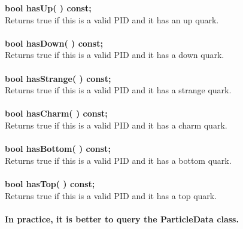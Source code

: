 \documentclass[twoside,12pt]{article}
\begin{document}
\begin{tabbing}
\hspace{0.5in}  {\bf bool hasUp( )      const; }\\
\hspace{0.5in}  Returns true if this is a valid PID and it has an up quark. \\ \\
\hspace{0.5in}  {\bf bool hasDown( )    const; }\\
\hspace{0.5in}  Returns true if this is a valid PID and it has a down quark.\\ \\
\hspace{0.5in}  {\bf bool hasStrange( ) const; }\\
\hspace{0.5in}  Returns true if this is a valid PID and it has a strange quark.\\ \\
\hspace{0.5in}  {\bf bool hasCharm( )   const; }\\
\hspace{0.5in}  Returns true if this is a valid PID and it has a charm quark.\\ \\
\hspace{0.5in}  {\bf bool hasBottom( )  const; }\\
\hspace{0.5in}  Returns true if this is a valid PID and it has a bottom quark.\\ \\
\hspace{0.5in}  {\bf bool hasTop( )     const; }\\
\hspace{0.5in}  Returns true if this is a valid PID and it has a top quark.\\ \\
\hspace{0.5in}  {\bf In practice, it is better to query the ParticleData class.} \\ \\


\end{tabbing}
\end{document}
